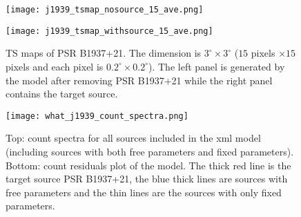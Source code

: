 \documentclass[12pt]{report}
\newcommand{\add}[1]{
  $<$\colorbox{red}{\textbf{add}}$>$#1$<$\colorbox{red}{\textbf{/add}}$>$
}
\begin{document}
        \begin{figure}[!htp]
          \centering
          \begin{minipage}{0.40\textwidth}
            \begin{center} 
              \texttt{[image: j1939\_tsmap\_nosource\_15\_ave.png]}
            \end{center}
          \end{minipage}
          \begin{minipage}{0.40\textwidth}
            \begin{center}
              \texttt{[image: j1939\_tsmap\_withsource\_15\_ave.png]}
            \end{center}
          \end{minipage}
          \caption{TS maps of PSR B1937+21. The dimension is $3^{\circ} \times 3^{\circ}$
            ($15$ pixels $\times 15$ pixels and each pixel is 
            $0.2^{\circ} \times 0.2^{\circ}$). The left panel is generated by the model 
            after removing PSR B1937+21 while the right panel contains the target source.}
          \label{fig: j1939_tsmap_comparison_15_ave}
        \end{figure}
  

        \begin{figure}[!htp]
          \centering 
          \texttt{[image: what\_j1939\_count\_spectra.png]}
          \caption{Top: count spectra for all sources included in the xml model (including 
            sources with both free parameters and fixed parameters). Bottom: count residuals plot
            of the model. The thick red line is the target source PSR B1937+21, the blue thick 
            lines are sources with free parameters and the thin lines are the sources with only 
            fixed parameters.}
          \label{fig: j1939_count_spectra_ave}
        \end{figure}
            

\end{document}
